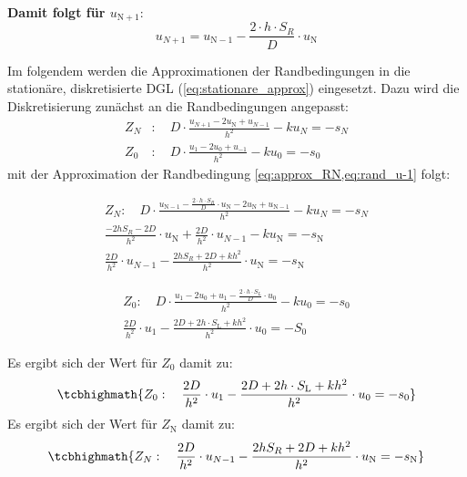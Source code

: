 \begin{qed}
	\textbf{Damit folgt für $u_{\mathrm{N}+1}$}:
	\begin{equation}\label{eq:approx_RN}
		u_{N+1} =u_{\mathrm{N}-1} -\frac{2\cdot h\cdot S_R}{D} \cdot
		u_\mathrm{N}
	\end{equation}
\end{qed}

Im folgendem werden die Approximationen der Randbedingungen in die stationäre,
diskretisierte DGL (\cref{eq:stationare_approx}) eingesetzt. Dazu wird die
Diskretisierung zunächst an die Randbedingungen angepasst:
\begin{equation}
	\begin{split}
		Z_N&: \quad	D\cdot
		\frac{u_{N+1}-2u_\mathrm{N}+u_{N-1}}{h^2}-ku_N=-s_N \\
		Z_0&: \quad D\cdot \frac{u_{1}-2u_0+u_{-1}}{h^2}-ku_0=-s_0
	\end{split}
\end{equation}
mit der Approximation der Randbedingung \cref{eq:approx_RN,eq:rand_u-1} folgt:

\begin{equation}
	\begin{split}
		Z_N: \quad	D\cdot
		\frac{u_{\mathrm{N}-1}-\frac{2\cdot h\cdot S_R}{D} \cdot u_\mathrm{N}
		-2u_\mathrm{N}+u_{\mathrm{N}-1}}{h^2}-ku_N=-s_N \\
		\frac{-2hS_R-2D}{h^2}\cdot
		u_\mathrm{N}+\frac{2D}{h^2}\cdot u_{N-1}-ku_\mathrm{N}=-s_\mathrm{N}\\
		\frac{2D}{h^2}\cdot
		u_{N-1}-\frac{2hS_R+2D+kh^2}{h^2}\cdot u_\mathrm{N}=-s_\mathrm{N}
	\end{split}
\end{equation}

\begin{equation}
	\begin{split}
		Z_0: \quad	D\cdot \frac{u_1-2u_0+u_1-\frac{2\cdot h\cdot
				S_L}{D} \cdot u_0 }{h^2}-ku_0=-s_0\\
		\frac{2D}{h^2}\cdot u_1 - \frac{2D+2h\cdot
			S_\mathrm{L}+kh^2}{h^2}\cdot u_0=-S_0
	\end{split}
\end{equation}

\begin{qed}
	Es ergibt sich der Wert für $Z_0$ damit zu:
	\begin{equation}
		\tcbhighmath{Z_0: \quad \frac{2D}{h^2}\cdot u_1 -
			\frac{2D+2h\cdot S_\mathrm{L}+kh^2}{h^2}\cdot u_0=-s_0}
	\end{equation}
	Es ergibt sich der Wert für $Z_\mathrm{N}$ damit zu:
	\begin{equation}
		\tcbhighmath{Z_N: \quad \frac{2D}{h^2}\cdot
			u_{N-1}-\frac{2hS_R+2D+kh^2}{h^2}\cdot u_\mathrm{N}=-s_\mathrm{N}}
	\end{equation}

\end{qed}


